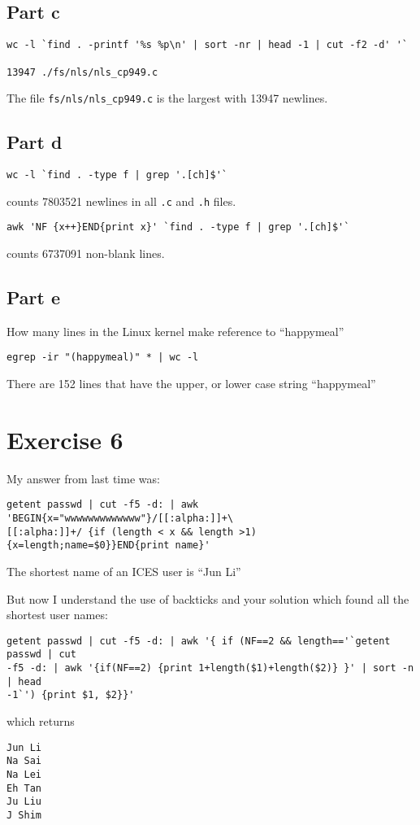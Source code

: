 \documentclass[letterpaper,10pt]{article}
\begin{document}
\subsection*{Part c}
\begin{verbatim}
wc -l `find . -printf '%s %p\n' | sort -nr | head -1 | cut -f2 -d' '`

13947 ./fs/nls/nls_cp949.c
\end{verbatim}
The file \verb=fs/nls/nls_cp949.c= is the largest with 13947 newlines.

\subsection*{Part d}
\verb=wc -l `find . -type f | grep '.[ch]$'`=

counts 7803521 newlines in all \verb=.c= and \verb=.h= files.

\verb=awk 'NF {x++}END{print x}' `find . -type f | grep '.[ch]$'`=

counts 6737091 non-blank lines.

\subsection*{Part e}
How many lines in the Linux kernel make reference to ``happymeal''

\verb=egrep -ir "(happymeal)" * | wc -l=

There are 152 lines that have the upper, or lower case string ``happymeal''

\section*{Exercise 6}
My answer from last time was:
\begin{verbatim}
getent passwd | cut -f5 -d: | awk 'BEGIN{x="wwwwwwwwwwwww"}/[[:alpha:]]+\
[[:alpha:]]+/ {if (length < x && length >1){x=length;name=$0}}END{print name}'
\end{verbatim}
The shortest name of an ICES user is ``Jun Li''

But now I understand the use of backticks and your solution which found all
the shortest user names:
\begin{verbatim}
getent passwd | cut -f5 -d: | awk '{ if (NF==2 && length=='`getent passwd | cut
-f5 -d: | awk '{if(NF==2) {print 1+length($1)+length($2)} }' | sort -n | head
-1`') {print $1, $2}}' 
\end{verbatim}
which returns
\begin{verbatim}
Jun Li
Na Sai
Na Lei
Eh Tan
Ju Liu
J Shim
\end{verbatim}
\end{document}

